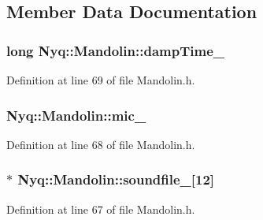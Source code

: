 \subsection{Member Data Documentation}
\subsubsection[{\texorpdfstring{damp\+Time\+\_\+}{dampTime_}}]{\setlength{\rightskip}{0pt plus 5cm}long Nyq\+::\+Mandolin\+::damp\+Time\+\_\+\hspace{0.3cm}{\ttfamily [protected]}}\hypertarget{class_nyq_1_1_mandolin_a5f202d7eb55bed29f6639169c1bb2992}{}\label{class_nyq_1_1_mandolin_a5f202d7eb55bed29f6639169c1bb2992}


Definition at line 69 of file Mandolin.\+h.

\subsubsection[{\texorpdfstring{mic\+\_\+}{mic_}}]{ Nyq\+::\+Mandolin\+::mic\+\_\+\hspace{0.3cm}{\ttfamily [protected]}}\hypertarget{class_nyq_1_1_mandolin_ac90f22a7f1923efff67e6e0b3ad5e275}{}\label{class_nyq_1_1_mandolin_ac90f22a7f1923efff67e6e0b3ad5e275}


Definition at line 68 of file Mandolin.\+h.

\subsubsection[{\texorpdfstring{soundfile\+\_\+}{soundfile_}}]{$\ast$ Nyq\+::\+Mandolin\+::soundfile\+\_\+\mbox{[}12\mbox{]}\hspace{0.3cm}{\ttfamily [protected]}}\hypertarget{class_nyq_1_1_mandolin_ae00de9a01d218beca7c004e266156b3b}{}\label{class_nyq_1_1_mandolin_ae00de9a01d218beca7c004e266156b3b}


Definition at line 67 of file Mandolin.\+h.

